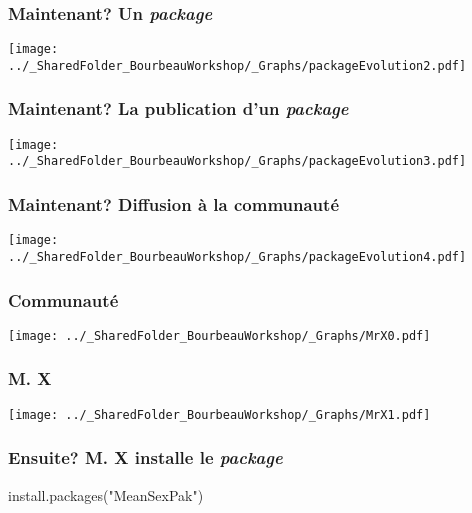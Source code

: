 \documentclass{beamer}
\begin{document}
    \begin{frame}
        \frametitle{Maintenant? Un \emph{package} \R} \vspace{1cm}
        \begin{center}
            \texttt{[image: ../\_SharedFolder\_BourbeauWorkshop/\_Graphs/packageEvolution2.pdf]}
        \end{center}
    \end{frame} 
    
    \begin{frame}
        \frametitle{Maintenant? La publication d'un \emph{package}} \vspace{1cm}
        \begin{center}
            \texttt{[image: ../\_SharedFolder\_BourbeauWorkshop/\_Graphs/packageEvolution3.pdf]}
        \end{center}
    \end{frame} 
    
    \begin{frame}
        \frametitle{Maintenant? Diffusion à la communauté} \vspace{1cm}
        \begin{center}
            \texttt{[image: ../\_SharedFolder\_BourbeauWorkshop/\_Graphs/packageEvolution4.pdf]}
        \end{center}
    \end{frame} 
    
    \begin{frame}
        \frametitle{Communauté \R} \vspace{1cm}
        \begin{center}
            \texttt{[image: ../\_SharedFolder\_BourbeauWorkshop/\_Graphs/MrX0.pdf]}
        \end{center}
    \end{frame}
    
    \begin{frame}
        \frametitle{M. X} \vspace{1cm}
        \begin{center}
            \texttt{[image: ../\_SharedFolder\_BourbeauWorkshop/\_Graphs/MrX1.pdf]}
        \end{center}
    \end{frame}

    \begin{frame}[fragile=singleslide]
        \frametitle{Ensuite? M. X installe le \emph{package}}
        \begin{code}
install.packages("MeanSexPak")
        \end{code}
    \end{frame}
    
\end{document}
